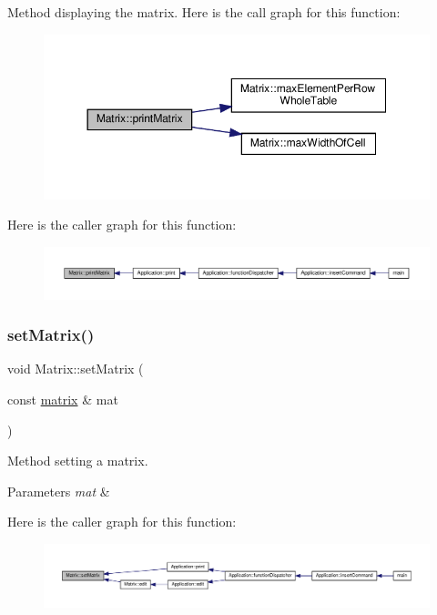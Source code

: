 Method displaying the matrix. Here is the call graph for this function\+:
\nopagebreak
\begin{figure}[H]
\begin{center}
\leavevmode
\includegraphics[width=350pt]{class_matrix_aa1967ad240a5ffaf492800044b7275d9_cgraph}
\end{center}
\end{figure}
Here is the caller graph for this function\+:
\nopagebreak
\begin{figure}[H]
\begin{center}
\leavevmode
\includegraphics[width=350pt]{class_matrix_aa1967ad240a5ffaf492800044b7275d9_icgraph}
\end{center}
\end{figure}
\mbox{\label{class_matrix_a8c45dd1354fa25e14065cab23f3074c0}} 
\subsubsection{\texorpdfstring{set\+Matrix()}{setMatrix()}}
{\footnotesize\ttfamily void Matrix\+::set\+Matrix (\begin{DoxyParamCaption}\item[{const \hyperlink{formula_8h_a869e2a5deeb3daa4c82d6bc91cf20d92}{matrix} \&}]{mat }\end{DoxyParamCaption})\hspace{0.3cm}{\ttfamily [inline]}}

Method setting a matrix. 
\begin{DoxyParams}{Parameters}
{\em mat} & \\
\hline
\end{DoxyParams}
Here is the caller graph for this function\+:
\nopagebreak
\begin{figure}[H]
\begin{center}
\leavevmode
\includegraphics[width=350pt]{class_matrix_a8c45dd1354fa25e14065cab23f3074c0_icgraph}
\end{center}
\end{figure}


